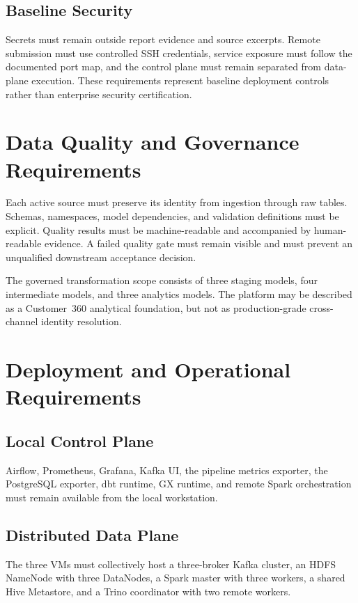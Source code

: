 \subsection{Baseline Security}
Secrets must remain outside report evidence and source excerpts. Remote submission must use controlled SSH credentials, service exposure must follow the documented port map, and the control plane must remain separated from data-plane execution. These requirements represent baseline deployment controls rather than enterprise security certification.

\section{Data Quality and Governance Requirements}
Each active source must preserve its identity from ingestion through raw tables. Schemas, namespaces, model dependencies, and validation definitions must be explicit. Quality results must be machine-readable and accompanied by human-readable evidence. A failed quality gate must remain visible and must prevent an unqualified downstream acceptance decision.

The governed transformation scope consists of three staging models, four intermediate models, and three analytics models. The platform may be described as a Customer~360 analytical foundation, but not as production-grade cross-channel identity resolution.

\section{Deployment and Operational Requirements}

\subsection{Local Control Plane}
Airflow, Prometheus, Grafana, Kafka UI, the pipeline metrics exporter, the PostgreSQL exporter, dbt runtime, GX runtime, and remote Spark orchestration must remain available from the local workstation.

\subsection{Distributed Data Plane}
The three VMs must collectively host a three-broker Kafka cluster, an HDFS NameNode with three DataNodes, a Spark master with three workers, a shared Hive Metastore, and a Trino coordinator with two remote workers.

